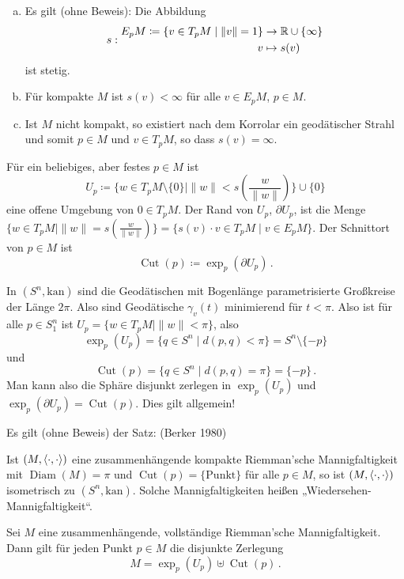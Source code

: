 \documentclass[a4paper,twoside,DIV15,BCOR12mm]{scrbook}
\renewcommand{\da}{\coloneqq}
\newcommand{\kan}{\text{kan}}
\DeclareMathOperator{\cut}{Cut}
\begin{document}
\begin{bemerkung}
\begin{enumerate}[(a)]
\item Es gilt (ohne Beweis): Die Abbildung 
\[
s:
\begin{aligned}
E_pM \da \{v \in T_pM \mid \|v\|=1\} &\to \MdR\cup\{\infty\} \\
v &\mapsto s(v)
\end{aligned}
\] ist stetig.
\item Für kompakte $M$ ist $s(v) < \infty$ für alle $v\in E_pM$, $p\in M$.
\item Ist $M$ nicht kompakt, so existiert nach dem Korrolar ein geodätischer Strahl und somit $p\in M$ und $v\in T_pM$, so dass $s(v)=\infty$.
\end{enumerate}
\end{bemerkung}

Für ein beliebiges, aber festes $p\in M$ ist
\[
U_p \da \{ w\in T_pM\setminus \{0\} \mid \|w\| < s(\frac w {\|w\|})\} \cup \{0\}
\] eine offene Umgebung von $0\in T_pM$. Der Rand von $U_p$, $\partial U_p$, ist die Menge $\{w\in T_pM | \|w\| = s(\frac w{\|w\|})\} = \{s(v) \cdot v \in T_pM \mid v \in E_pM\}$. Der Schnittort von $p\in M$ ist \[ \cut(p) \da \exp_p(\partial U_p)\,.\]

\begin{beispiel}
In $(S^n,\kan)$ sind die Geodätischen mit Bogenlänge parametrisierte Großkreise der Länge $2\pi$. Also sind Geodätische $\gamma_v(t)$ minimierend für $t<\pi$. Also ist für alle $p\in S^n_1$ ist $U_p=\{w\in T_pM \mid \|w\| <\pi\}$, also \[\exp_p(U_p) = \{q\in S^n \mid d(p,q)<\pi \} = S^n\setminus \{-p\}\] und \[\cut(p) = \{q\in S^n \mid d(p,q)=\pi \} = \{-p\}\,.\] Man kann also die Sphäre disjunkt zerlegen in $\exp_p(U_p)$ und $\exp_p(\partial U_p) = \cut(p)$. Dies gilt allgemein!
\end{beispiel}

\begin{bemerkung}
Es gilt (ohne Beweis) der Satz: (Berker 1980)

Ist $(M,\langle\cdot,\cdot\rangle)$ eine zusammenhängende kompakte Riemman’sche Mannigfaltigkeit mit $\operatorname{Diam}(M)=\pi$ und $\cut(p) = \{\text{Punkt}\}$ für alle $p\in M$, so ist $(M,\langle\cdot,\cdot\rangle)$ isometrisch zu $(S^n,\kan)$. Solche Mannigfaltigkeiten heißen „Wiedersehen-Mannigfaltigkeit“.
\end{bemerkung}

\begin{satz}[Zerlegungssatz]
\label{zerlsatz}
Sei $M$ eine zusammenhängende, vollständige Riemman’sche Mannigfaltigkeit. Dann gilt für jeden Punkt $p\in M$ die disjunkte Zerlegung
\[
M = \exp_p(U_p) \uplus \cut(p)\,.
\]
\end{satz}
\end{document}
